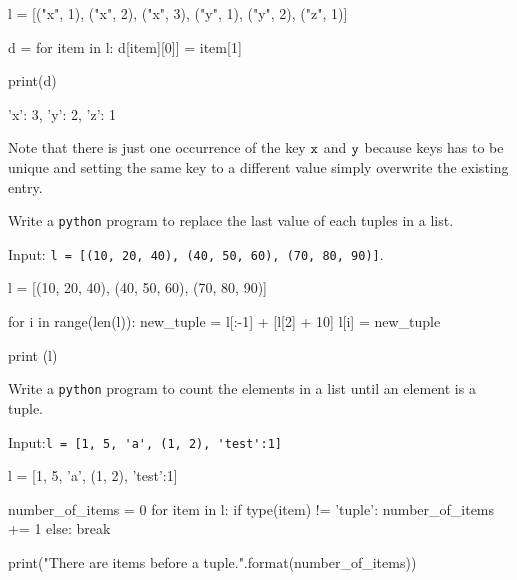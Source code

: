 \cprotEnv\begin{solution}
\begin{ipython}
l = [("x", 1), ("x", 2), ("x", 3), ("y", 1), ("y", 2), ("z", 1)]

d = {}
for item in l:
    d[item][0]] = item[1]
    
print(d)
\end{ipython}
\begin{ioutput}
{'x': 3, 'y': 2, 'z': 1}
\end{ioutput}
Note that there is just one occurrence of the key $\tt{x}$ and $\tt{y}$ because keys has to be unique and setting the same key to a different value simply overwrite the existing entry.
\end{solution}

\begin{question}
Write a \texttt{python} program to replace the last value of each tuples in a list.

\noindent
Input: \lstinline[language=iPython]|l = [(10, 20, 40), (40, 50, 60), (70, 80, 90)]|.
\end{question}

\cprotEnv\begin{solution}
\begin{ipython}
l = [(10, 20, 40), (40, 50, 60), (70, 80, 90)]

for i in range(len(l)):
    new_tuple = l[:-1] + [l[2] + 10]
    l[i] = new_tuple
    
print (l)
\end{ipython}
\begin{ioutput}
[(10, 20, 50), (40, 50, 70), (70, 80, 100)]
\end{ioutput}
\end{solution}

\begin{question}
Write a \texttt{python} program to count the elements in a list until an element is a tuple.

\noindent
Input:\lstinline[language=iPython]|l = [1, 5, 'a', (1, 2), 'test':1]|
\end{question}

\cprotEnv\begin{solution}
\begin{ipython}
l = [1, 5, 'a', (1, 2), 'test':1]

number_of_items = 0 
for item in l:
    if type(item) != 'tuple'{:}
        number_of_items += 1
    else:
        break
        
print("There are {} items before a tuple.".format(number_of_items))
\end{ipython}
\begin{ioutput}
\end{ioutput}
\end{solution}

